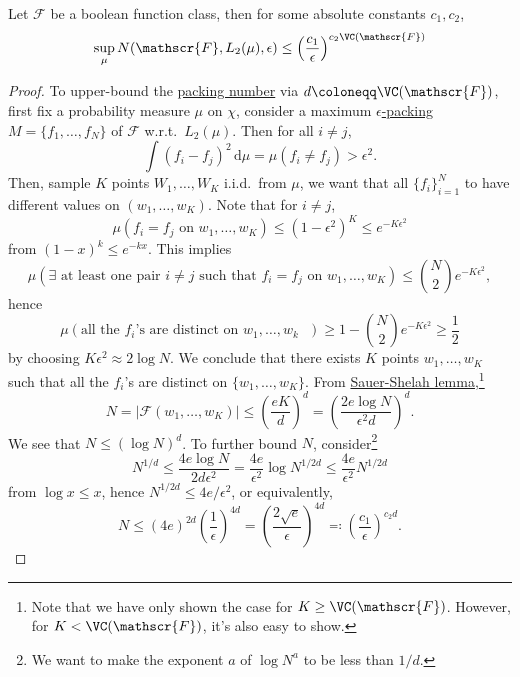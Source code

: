\begin{theorem}[Dudley]\label{thm:Dudley}
	Let \(\mathscr{F} \) be a boolean function class, then for some absolute constants \(c_1, c_2\),
	\[
		\sup _\mu N(\mathscr{F} , L_2(\mu ), \epsilon ) \leq \left( \frac{c_1}{\epsilon } \right) ^{c_2 \VC(\mathscr{F} )}
	\]
\end{theorem}
\begin{proof}
	To upper-bound the \hyperref[def:packing-number]{packing number} via \(d\coloneqq \VC(\mathscr{F} )\), first fix a probability measure \(\mu \) on \(\chi \), consider a maximum \hyperref[def:eps-packing]{\(\epsilon\)-packing} \(M=\{ f_1, \dots , f_N \} \) of \(\mathscr{F} \) w.r.t.\ \(L_2(\mu )\). Then for all \(i \neq j\),
	\[
		\int (f_i - f_j)^2 \,\mathrm{d} \mu
		= \mu (f_i \neq f_j)
		> \epsilon ^2.
	\]
	Then, sample \(K\) points \(W_1, \dots , W_K\) i.i.d.\ from \(\mu \), we want that all \(\{ f_i \}_{i=1}^N \) to have different values on \((w_1, \dots , w_K)\). Note that for \(i \neq j\),
	\[
		\mu (f_i = f_j \text{ on } w_1, \dots , w_K)
		\leq (1-\epsilon ^2)^K
		\leq e^{-K \epsilon ^2}
	\]
	from \((1-x)^k \leq e^{-kx}\). This implies
	\[
		\mu  (\exists \text{ at least one pair \(i\neq j\) such that \(f_i = f_j\) on \(w_1, \dots , w_K\)}) \leq \binom{N}{2}e^{-K \epsilon ^2},
	\]
	hence
	\[
		\mu (\text{all the \(f_i\)'s are distinct on \(w_1, \dots , w_k\) }) \geq 1 - \binom{N}{2}e^{-K\epsilon ^2} \geq \frac{1}{2}
	\]
	by choosing \(K\epsilon ^2 \approx 2 \log N\). We conclude that there exists \(K\) points \(w_1, \dots , w_K\) such that all the \(f_i\)'s are distinct on \(\{ w_1, \dots , w_K \} \). From \hyperref[lma:Sauer-Shelah]{Sauer-Shelah lemma},\footnote{Note that we have only shown the case for \(K \geq \VC(\mathscr{F} )\). However, for \(K < \VC(\mathscr{F} )\), it's also easy to show.}
	\[
		N
		= \vert \mathscr{F} (w_1, \dots , w_K) \vert
		\leq \left( \frac{eK}{d} \right) ^{d}
		= \left( \frac{2e \log N}{\epsilon ^2 d} \right) ^d.
	\]
	We see that \(N \leq (\log N)^d\). To further bound \(N\), consider\footnote{We want to make the exponent \(a\) of \(\log N^a\) to be less than \(1 / d\).}
	\[
		N^{1 / d} \leq \frac{4e \log N}{2 d \epsilon ^2} = \frac{4e}{\epsilon ^2} \log N^{1 / 2d} \leq \frac{4e}{\epsilon ^2} N^{1 / 2d}
	\]
	from \(\log x \leq x\), hence \(N^{1 / 2d} \leq 4e / \epsilon ^2\), or equivalently,
	\[
		N
		\leq (4e)^{2d} \left( \frac{1}{\epsilon } \right) ^{4d}
		= \left( \frac{2\sqrt{e} }{\epsilon } \right) ^{4d}
		\eqqcolon \left( \frac{c_1}{\epsilon } \right) ^{c_2 d}.
	\]
\end{proof}

